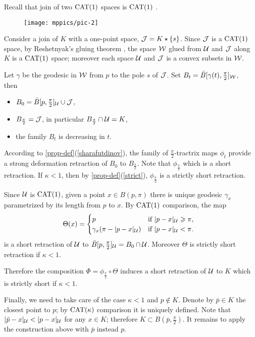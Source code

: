 \documentclass[oneside,a4paper, 12pt]{article}
\begin{document}
Recall that join of two $\mathrm{CAT}(1)$ spaces is $\mathrm{CAT}(1)$ \cite[Corollary 3.14]{bridson-haefliger}.

\begin{wrapfigure}{o}{50 mm}
\vskip-0mm
\centering
\texttt{[image: mppics/pic-2]}
\end{wrapfigure} 

Consider a join of  $K$ with a one-point space, $\mathcal{J}=K\star \{s\}$.
Since $\mathcal{J}$ is a $\mathrm{CAT}(1)$ space,
by Reshetnyak's gluing theorem \cite[8.9.1]{akp}, the space $\mathcal{W}$ glued from ${\mathcal{U}}$ and $\mathcal{J}$ along $K$ is a $\mathrm{CAT}(1)$ space;
moreover each space ${\mathcal{U}}$ and $\mathcal{J}$ is a convex subsets in $\mathcal{W}$.


Let $\gamma$ be the geodesic in $\mathcal{W}$ from $p$ to the pole $s$ of $\mathcal{J}$.
Set $B_t=\bar B[\gamma(t),\tfrac\pi2]_{\mathcal{W}}$, then
\begin{itemize}
\item $B_0=\bar B[p,\tfrac\pi2]_{\mathcal{U}}\cup \mathcal{J}$,
\item $B_{\frac\pi2}=\mathcal{J}$, in particular $B_{\frac\pi2}\cap \mathcal{U}=K$,
\item the family $B_t$ is decreasing in $t$.
\end{itemize}
According to \ref{prop-def}(\ref{sharafutdinov}), the family of $\tfrac\pi2$-tractrix maps $\phi_t$ provide a strong deformation retraction of $B_0$ to $B_{\frac\pi2}$.
Note that $\phi_{\frac\pi2}$ which is a short retraction.
If $\kappa<1$, then by \ref{prop-def}(\ref{strict}), $\phi_{\frac\pi2}$ is a strictly short retraction.

Since ${\mathcal{U}}$ is $\mathrm{CAT}(1)$,
given a point $x\in B(p,\pi)$ there is unique geodesic $\gamma_x$ parametrized by its length from $p$ to $x$. 
By $\mathrm{CAT}(1)$ comparison, the map 
\[\Theta(x)=
\begin{cases}
p&\text{if\ }|p-x|_{\mathcal{U}}\geqslant \pi,
\\
\gamma_x(\pi-|p-x|_{\mathcal{U}})&\text{if\ }|p-x|_{\mathcal{U}}< \pi.
\end{cases}
\]
is a short retraction of ${\mathcal{U}}$ to $\bar B[p,\tfrac\pi2]_{\mathcal{U}}=B_0\cap \mathcal{U}$.
Moreover $\Theta$ is strictly short retraction if $\kappa<1$.

Therefore the composition $\Phi=\phi_{\frac\pi2}\circ\Theta$ induces a short retraction of ${\mathcal{U}}$ to $K$
which is strictly short if $\kappa<1$.

Finally, we need to take care of the case $\kappa<1$ and $p\notin K$.
Denote by $\bar p\in K$ the closest point to $p$; by $\mathrm{CAT}(\kappa)$ comparison it is uniquely defined.
Note that $|\bar p-x|_{\mathcal{U}}< |p-x|_{\mathcal{U}}$ for any $x\in K$;
therefore $K\subset B(\bar p,\tfrac\pi2)$. 
It remains to apply the construction above with $\bar p$ instead $p$.
\qeds
\end{document}
